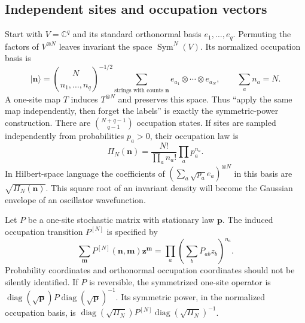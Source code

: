 \documentclass[11pt,reqno]{amsart}
\theoremstyle{definition}
\theoremstyle{remark}
\DeclareMathOperator{\diag}{diag}
\begin{document}
\subsection{Independent sites and occupation vectors}
Start with $V=\mathbb C^q$ and its standard orthonormal basis
$e_1,\ldots,e_q$. Permuting the factors of $V^{\otimes N}$ leaves
invariant the space $\operatorname{Sym}^N(V)$. Its normalized occupation
basis is
\[
|\mathbf n\rangle=\binom{N}{n_1,\ldots,n_q}^{-1/2}
\sum_{\text{strings with counts }\mathbf n}
 e_{a_1}\otimes\cdots\otimes e_{a_N},\qquad\sum_a n_a=N.
\]
A one-site map $T$ induces $T^{\otimes N}$ and preserves this space.
Thus ``apply the same map independently, then forget the labels'' is
exactly the symmetric-power construction. There are
$\binom{N+q-1}{q-1}$ occupation states.
If sites are sampled independently from probabilities $p_a>0$, their
occupation law is
\begin{equation}\label{eq:multweight}
\Pi_N(\mathbf n)=\frac{N!}{\prod_an_a!}\prod_ap_a^{n_a}.
\end{equation}
In Hilbert-space language the coefficients of
$(\sum_a\sqrt{p_a}e_a)^{\otimes N}$ in this basis are
$\sqrt{\Pi_N(\mathbf n)}$. This square root of an invariant density
will become the Gaussian envelope of an oscillator wavefunction.

Let $P$ be a one-site stochastic matrix with stationary law $\mathbf p$.
The induced occupation transition $P^{[N]}$ is specified by
\begin{equation}\label{eq:occGF}
\sum_{\mathbf m}P^{[N]}(\mathbf n,\mathbf m)\mathbf z^{\mathbf m}
=\prod_a\left(\sum_bP_{ab}z_b\right)^{n_a}.
\end{equation}
Probability coordinates and orthonormal occupation coordinates should
not be silently identified. If $P$ is reversible, the symmetrized
one-site operator is $\diag(\sqrt{\mathbf p})P\diag(\sqrt{\mathbf p})^{-1}$.
Its symmetric power, in the normalized occupation basis, is
$\diag(\sqrt{\Pi_N})P^{[N]}\diag(\sqrt{\Pi_N})^{-1}$.
\end{document}
